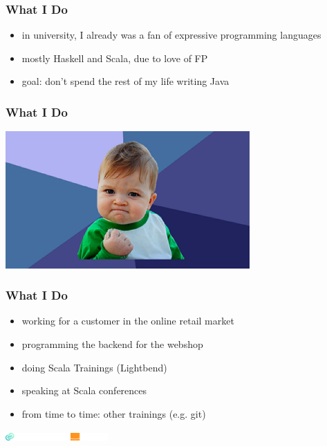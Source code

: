 \documentclass{beamer}
\begin{document}
\begin{frame}
  \frametitle{What I Do}
  \begin{itemize}
  \item in university, I already was a fan of expressive programming
    languages
  \item mostly Haskell and Scala, due to love of FP
  \item goal: don't spend the rest of my life writing Java
  \end{itemize}
\end{frame}

\begin{frame}
  \frametitle{What I Do}
  \begin{center}
    \includegraphics[width=0.7\textwidth]{pics/success.jpg}
  \end{center}
\end{frame}

\begin{frame}
  \frametitle{What I Do}
  \begin{itemize}
  \item working for a customer in the online retail market
  \item programming the backend for the webshop
  \item doing Scala Trainings (Lightbend)
  \item speaking at Scala conferences
  \item from time to time: other trainings (e.g. git)
  \end{itemize}
  \vfill{}
  \includegraphics[height=3mm]{pics/codecentric-logo.png}
  \hfill{}
  \includegraphics[height=3mm]{pics/lightbend}
\end{frame}
\end{document}
